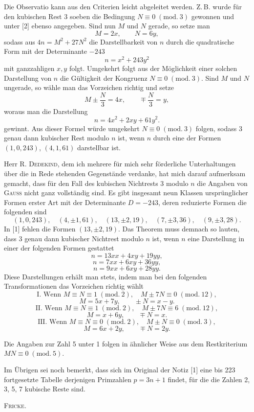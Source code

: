 
Die Observatio kann aus den Criterien leicht abgeleitet werden. Z.\,B. wurde für den kubischen Rest 3
soeben die Bedingung $N\equiv 0\;(\mathrm{mod.}\ 3)$ gewonnen und unter [2] ebenso angegeben. Sind nun $M$ und $N$
gerade, so setze man
\[ M=2x,\qquad N=6y, \]
sodass aus $4n=M^2+27N^2$ die Darstellbarkeit von $n$ durch die quadratische Form mit der Determinante $-243$
\[ n=x^2+243y^2 \]
mit ganzzahligen $x, y$ folgt. Umgekehrt folgt aus der Möglichkeit einer solchen Darstellung von $n$
die Gültigkeit der Kongruenz $N\equiv 0\;(\mathrm{mod.}\ 3)$. Sind $M$ und $N$ ungerade, so wähle man das Vorzeichen richtig und setze
\[ M\pm\dfrac{N}{3}=4x,\qquad \mp\dfrac{N}{3}=y, \]
woraus man die Darstellung
\[ n=4x^2+2xy+61y^2. \]
gewinnt. Aus dieser Formel würde umgekehrt $N\equiv 0\;(\mathrm{mod.}\ 3)$ folgen, sodass 3 genau dann kubischer Rest
modulo $n$ ist, wenn $n$ durch eine der Formen $(1,0,243)$, $(4,1,61)$ darstellbar ist.

Herr R. \textsc{Dedekind}, dem ich mehrere für mich sehr förderliche Unterhaltungen über die in
Rede stehenden Gegenstände verdanke, hat mich darauf aufmerksam gemacht, dass für den Fall des kubischen
Nichtrests 3 modulo $n$ die Angaben von \textsc{Gauss} nicht ganz vollständig sind. Es gibt insgesamt neun Klassen ursprünglicher Formen erster Art mit der Determinante $D=-243$, deren reduzierte Formen die folgenden sind
\[ (1,0,243),\quad (4,\pm1,61),\quad (13,\pm2,19),\quad (7,\pm3,36),\quad (9,\pm3,28). \]
In [1] fehlen die Formen $(13,\pm2,19)$. Das Theorem muss demnach so lauten, dass 3 genau
dann kubischer Nichtrest modulo $n$ ist, wenn $n$ eine Darstellung in einer der folgenden Formen gestattet
\[ n=13xx+4xy+19yy, \]
\[ n=7xx+6xy+36yy, \]
\[ n=9xx+6xy+28yy. \]
Diese Darstellungen erhält man stets, indem man bei den folgenden Transformationen das Vorzeichen richtig wählt
\[ \text{I. Wenn } M\equiv N\equiv 1\;(\mathrm{mod.}\ 2),\quad M\pm 7N\equiv 0\;(\mathrm{mod.}\ 12), \]
\[ M=5x+7y,\qquad \pm N=x-y. \]
\[ \text{II. Wenn } M\equiv N\equiv 1\;(\mathrm{mod.}\ 2),\quad M\pm 7N\equiv 6\;(\mathrm{mod.}\ 12), \]
\[ M=x+6y,\qquad \mp N=x. \]
\[ \text{III. Wenn } M\equiv N\equiv 0\;(\mathrm{mod.}\ 2),\quad M\pm N\equiv 0\;(\mathrm{mod.}\ 3), \]
\[ M=6x+2y,\qquad \mp N=2y. \]
\par\noindent\hspace*{\parindent}Die Angaben zur Zahl 5 unter 1 folgen in ähnlicher Weise aus dem Restkriterium
$MN\equiv 0\;(\mathrm{mod.}\ 5)$.

Im Übrigen sei noch bemerkt, dass sich im Original der Notiz [1] eine bis 223 fortgesetzte Tabelle derjenigen Primzahlen $p=3n+1$ findet, für die die Zahlen 2, 3, 5, 7 kubische Reste sind.

\hfill \textsc{Fricke.}

\endgroup
